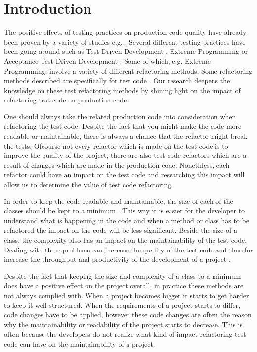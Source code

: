 \section{Introduction}
The positive effects of testing practices on production code quality have already been proven by a variety of studies e.g. \cite{laitenberger1998studying,binder1996testing}. Several different testing practices have been going around such as Test Driven Development \cite{erdogmus2010test}, Extreme Programming \cite{lindstrom2004extreme} or Acceptance Test-Driven Development \cite{aggarwal2014acceptance}. Some of which, e.g. Extreme Programming, involve a variety of different refactoring methods. Some refactoring methods described are specifically for test code \cite{van2001refactoring}. Our research deepens the knowledge on these test refactoring methods by shining light on the impact of refactoring test code on production code.

One should always take the related production code into consideration when refactoring the test code. Despite the fact that you might make the code more readable or maintainable, there is always a chance that the refactor might break the tests. Ofcourse not every refactor which is made on the test code is to improve the quality of the project, there are also test code refactors which are a result of changes which are made in the production code. Nonethless, each refactor could have an impact on the test code and researching this impact will allow us to determine the value of test code refactoring.

In order to keep the code readable and maintainable, the size of each of the classes should be kept to a minimum \cite{baggen2012standardized}. This way it is easier for the developer to understand what is happening in the code and when a method or class has to be refactored the impact on the code will be less significant. Beside the size of a class, the complexity also has an impact on the maintainability of the test code. Dealing with these problems can increase the quality of the test code and therefor increase the throughput and productivity of the development of a project \cite{athanasiou2011constructing}.

Despite the fact that keeping the size and complexity of a class to a minimum does have a positive effect on the project overall, in practice these methods are not always complied with. When a project becomes bigger it starts to get harder to keep it well structured. When the requirements of a project starts to differ, code changes have to be applied, however these code changes are often the reason why the maintainability or readability of the project starts to decrease. This is often because the developers do not realize what kind of impact refactoring test code can have on the maintainability of a project.

